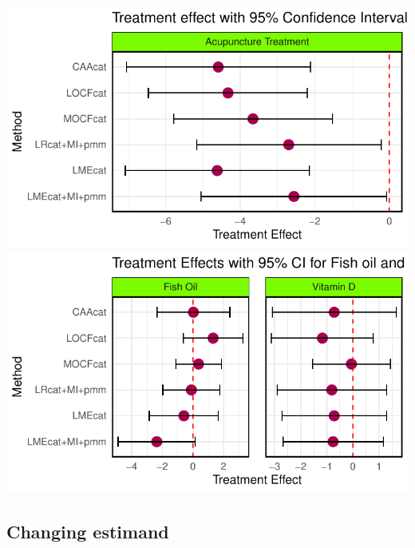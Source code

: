 \documentclass{article}
\newcommand{\pandocbounded}[1]{#1}
\begin{document}
\pandocbounded{\includegraphics[keepaspectratio]{Final_Report_files/figure-latex/unnamed-chunk-30-1.pdf}}
\pandocbounded{\includegraphics[keepaspectratio]{Final_Report_files/figure-latex/unnamed-chunk-30-2.pdf}}

\subsection{Changing estimand}\label{changing-estimand}
\end{document}
